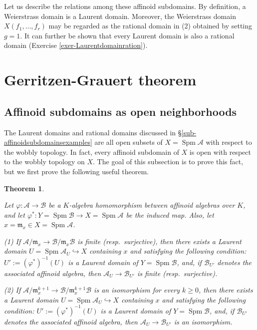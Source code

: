 \documentclass[a4paper,12pt, dvipdfmx]{jsbook}
\def\m{\mathfrak{m}}
\def\Spm{\mathop{\mathrm{Spm}}\nolimits}
\theoremstyle{plain}
\newtheorem{thm}{\bfseries Theorem}[section]
\theoremstyle{definition}
\begin{document}
Let us describe the relations among these affinoid subdomains.
By definition, a Weierstrass domain is a Laurent domain.
Moreover, the Weierstrass domain $X(f_1,\ldots,f_r)$ may be regarded as the rational domain in (2) obtained by setting $g=1$.
It can further be shown that every Laurent domain is also a rational domain (Exercise \ref{exer-Laurentdomainration}).

\section{Gerritzen-Grauert theorem}\label{sec-GG}
\subsection{Affinoid subdomains as open neighborhoods}\label{sub-opennessaffinoidsubdomains}
The Laurent domains and rational domains discussed in \S\ref{sub-affinoidsubdomainsexamples} are all open subsets of $X=\Spm\mathcal{A}$ with respect to the wobbly topology.
In fact, every affinoid subdomain of $X$ is open with respect to the wobbly topology on $X$.
The goal of this subsection is to prove this fact, but we first prove the following useful theorem.
\begin{thm}\label{thm-affinoidsubdomainneighborhood}{\rm 
Let $\varphi\colon\mathcal{A}\rightarrow\mathcal{B}$ be a $K$-algebra homomorphism between affinoid algebras over $K$, and let $\varphi^{\ast}\colon Y=\Spm\mathcal{B}\rightarrow X=\Spm\mathcal{A}$ be the induced map.
Also, let $x=\m_x\in X=\Spm\mathcal{A}$.

(1) If $\mathcal{A}/\m_x\rightarrow\mathcal{B}/\m_x\mathcal{B}$ is finite (resp.\ surjective), then there exists a Laurent domain $U=\Spm\mathcal{A}_U\hookrightarrow X$ containing $x$ and satisfying the following condition: $U':=(\varphi^{\ast})^{-1}(U)$ is a Laurent domain of $Y=\Spm\mathcal{B}$, and, if $\mathcal{B}_{U'}$ denotes the associated affinoid algebra, then $\mathcal{A}_U\rightarrow\mathcal{B}_{U'}$ is finite (resp.\ surjective).

(2) If $\mathcal{A}/\m^{k+1}_x\rightarrow\mathcal{B}/\m^{k+1}_x\mathcal{B}$ is an isomorphism for every $k\geq 0$, then there exists a Laurent domain $U=\Spm\mathcal{A}_U\hookrightarrow X$ containing $x$ and satisfying the following condition: $U':=(\varphi^{\ast})^{-1}(U)$ is a Laurent domain of $Y=\Spm\mathcal{B}$, and, if $\mathcal{B}_{U'}$ denotes the associated affinoid algebra, then $\mathcal{A}_U\rightarrow\mathcal{B}_{U'}$ is an isomorphism.}
\end{thm}
\end{document}
